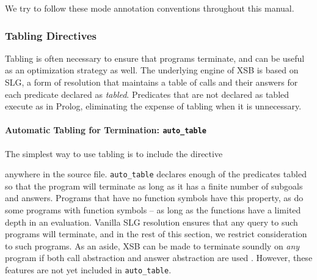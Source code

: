 We try to follow these mode annotation conventions throughout this manual.

%

\subsubsection{Tabling Directives}\label{tabling_directives}
 Tabling is often necessary
to ensure that programs terminate, and can be useful as an
optimization strategy as well.  The underlying engine of XSB is based
on SLG, a form of resolution that maintains a table of calls and their
answers for each predicate declared as {\em tabled}.  Predicates that
are not declared as tabled execute as in Prolog, eliminating the
expense of tabling when it is unnecessary.

\paragraph{Automatic Tabling for Termination: {\tt auto\_table}}
The simplest way to use tabling is to include the directive


\noindent
anywhere in the source file.  {\tt auto\_table} declares enough of the
predicates tabled so that the program will terminate as long as it has
a finite number of subgoals and answers.  Programs that have no
function symbols have this property, as do some programs with function
symbols -- as long as the functions have a limited depth in an
evaluation.  Vanilla SLG resolution ensures that any query to such
programs will terminate, and in the rest of this section, we restrict
consideration to such programs. As an aside, XSB can be made to terminate
  soundly on {\em any} program if both call abstraction and answer
  abstraction are used \cite{GroS13,RigS14}.  However, these features
  are not yet included in {\tt auto\_table}.
  
